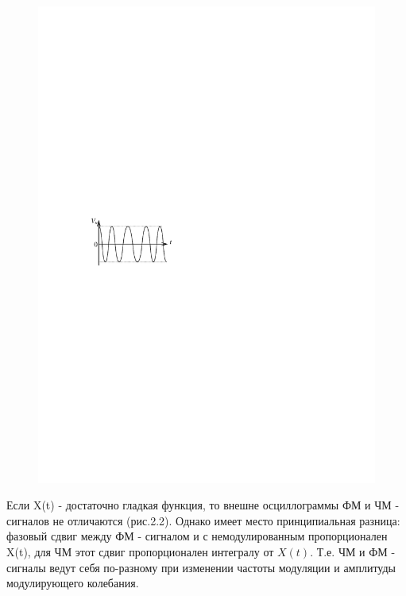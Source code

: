 \documentclass[a4paper,12pt]{article}
\begin{document}
\begin{figure} 
	\vspace{-2ex}
	\centering
	\includegraphics[scale=1.1]{fig/fig2-2}
	\caption{}
	\label{fig:2.2}
\end{figure}
Если X(t) - достаточно гладкая функция, то внешне осциллограммы ФМ и ЧМ - сигналов не отличаются (рис.2.2). Однако имеет место принципиальная разница: фазовый сдвиг между ФМ - сигналом и с немодулированным пропорционален X(t), для ЧМ этот сдвиг пропорционален интегралу от $X(t)$. Т.е. ЧМ и ФМ - сигналы ведут себя по-разному при изменении частоты модуляции и амплитуды модулирующего колебания.
\end{document}
